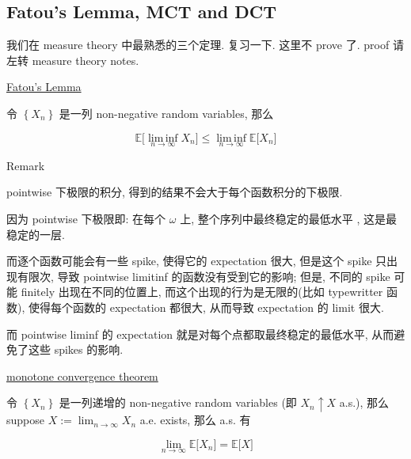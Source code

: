 \documentclass{qlnotes-export}
\begin{document}
\subsection{Fatou's Lemma, MCT and DCT}\label{fatous-lemma-mct-and-dct}

我们在 measure theory 中最熟悉的三个定理. 复习一下. 这里不 prove 了. proof 请左转 measure theory notes.

\begin{theorem}{\href{https://qiulinfan.github.io/notes/math/measure-theory/\#kn-fatou-lemma}{Fatou's
Lemma}}

令 \(\left\{ X_{n} \right\}\) 是一列 non-negative random variables, 那么

\[{\mathbb{E}}\lbrack\operatorname{lim\, inf}\limits_{n\rightarrow\infty}X_{n}\rbrack \leq \operatorname{lim\, inf}\limits_{n\rightarrow\infty}{\mathbb{E}}\lbrack X_{n}\rbrack\]

\end{theorem}

\begin{qlremark}{Remark}

pointwise 下极限的积分, 得到的结果不会大于每个函数积分的下极限.

因为 pointwise 下极限即: 在每个 \(\omega\) 上, 整个序列中最终稳定的最低水平 , 这是最稳定的一层.

而逐个函数可能会有一些 spike, 使得它的 expectation 很大, 但是这个 spike 只出现有限次, 导致 pointwise limitinf 的函数没有受到它的影响; 但是, 不同的 spike 可能 finitely 出现在不同的位置上, 而这个出现的行为是无限的(比如 typewritter 函数), 使得每个函数的 expectation 都很大, 从而导致 expectation 的 limit 很大.

而 pointwise liminf 的 expectation 就是对每个点都取最终稳定的最低水平, 从而避免了这些 spikes 的影响.

\end{qlremark}

\begin{theorem}{\href{https://qiulinfan.github.io/notes/math/measure-theory/\#kn-monotone-convergence-theorem}{monotone
convergence theorem}}

令 \(\left\{ X_{n} \right\}\) 是一列递增的 non-negative random variables (即 \(X_{n} \uparrow X\) a.s.), 那么 suppose \(X := \lim_{n\rightarrow\infty}X_{n}\) a.e. exists, 那么 a.s. 有

\[\lim\limits_{n\rightarrow\infty}{\mathbb{E}}\lbrack X_{n}\rbrack = {\mathbb{E}}\lbrack X\rbrack\]

\end{theorem}
\end{document}
